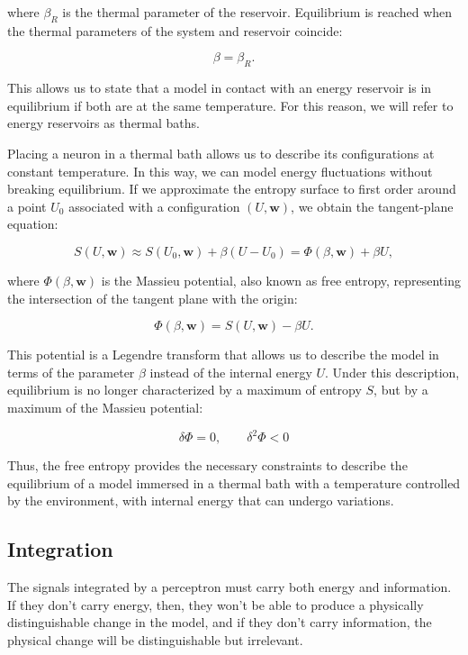 \documentclass[12pt]{article}
\begin{document}
where $\beta_R$ is the thermal parameter of the reservoir. Equilibrium is reached when the thermal parameters of the system and reservoir coincide:

\begin{equation}
\beta = \beta_R.
\end{equation}

This allows us to state that a model in contact with an energy reservoir is in equilibrium if both are at the same temperature. For this reason, we will refer to energy reservoirs as thermal baths.

Placing a neuron in a thermal bath allows us to describe its configurations at constant temperature. In this way, we can model energy fluctuations without breaking equilibrium. If we approximate the entropy surface to first order around a point $U_0$ associated with a configuration $(U, \mathbf{w})$, we obtain the tangent-plane equation:

\begin{equation}
S(U, \mathbf{w}) \approx S(U_0,\mathbf{w}) + \beta(U-U_0) = \Phi(\beta, \mathbf{w}) + \beta U,
\end{equation}

where $\Phi(\beta, \mathbf{w})$ is the Massieu potential, also known as free entropy, representing the intersection of the tangent plane with the origin:

\begin{equation}
\Phi(\beta, \mathbf{w}) = S(U,\mathbf{w}) - \beta U.
\end{equation}
  
This potential is a Legendre transform that allows us to describe the model in terms of the parameter $\beta$ instead of the internal energy $U$. Under this description, equilibrium is no longer characterized by a maximum of entropy $S$, but by a maximum of the Massieu potential:

\begin{equation}
\delta \Phi = 0, \qquad \delta^2 \Phi < 0
\end{equation}

Thus, the free entropy provides the necessary constraints to describe the equilibrium of a model immersed in a thermal bath with a temperature controlled by the environment, with internal energy that can undergo variations.
\subsection*{Integration}

The signals integrated by a perceptron must carry both energy and information. If they don't carry energy, then, they won't be able to produce a physically distinguishable change in the model, and if they don't carry information, the physical change will be distinguishable but irrelevant.
\end{document}
